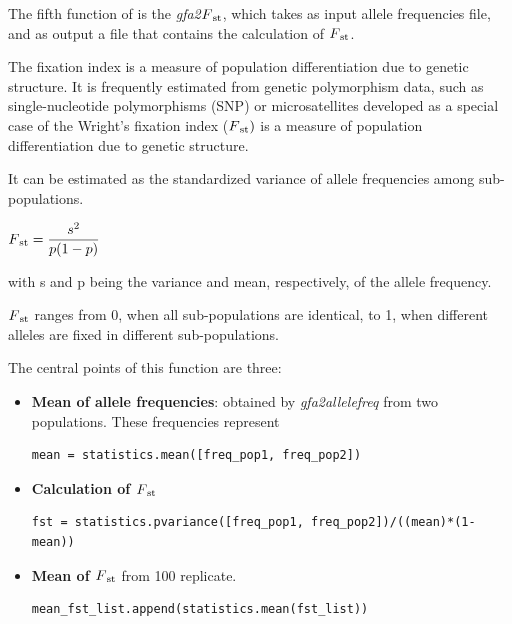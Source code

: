 The fifth function of \vgp is the \textit{gfa2$F\textsubscript{st}$}, which takes as input allele frequencies file, and as output a file that contains the calculation of $F\textsubscript{st}$.

The fixation index is a measure of population differentiation due to genetic structure. It is frequently estimated from genetic polymorphism data, such as single-nucleotide polymorphisms (SNP) or microsatellites developed as a special case of
the Wright’s fixation index ($F\textsubscript{st})$ is a measure of population differentiation due to genetic structure. 

It can be estimated as the standardized variance of allele frequencies among sub-populations.

$F\textsubscript{st} = \dfrac{s^{2}}{p(1-p)}$

with s and p being the variance and mean, respectively, of the allele frequency. 

$F\textsubscript{st}$ \cite{barbujani2010human} ranges from 0, when all sub-populations are identical, to 1, when different alleles are fixed in different sub-populations.


The central points of this function are three:



\begin{itemize}
\item\textbf{Mean of  allele frequencies}:  obtained by \textit{gfa2allelefreq} from two populations. These frequencies represent 
\begin{verbatim}
mean = statistics.mean([freq_pop1, freq_pop2])
\end{verbatim}
 
\item\textbf{Calculation of $F\textsubscript{st}$}

\begin{verbatim}
fst = statistics.pvariance([freq_pop1, freq_pop2])/((mean)*(1-mean))
\end{verbatim}
\item\textbf {Mean of $F\textsubscript{st}$} from 100 replicate. 

\begin{verbatim}
mean_fst_list.append(statistics.mean(fst_list))
\end{verbatim}
\end{itemize}




\vspace{8cm}


